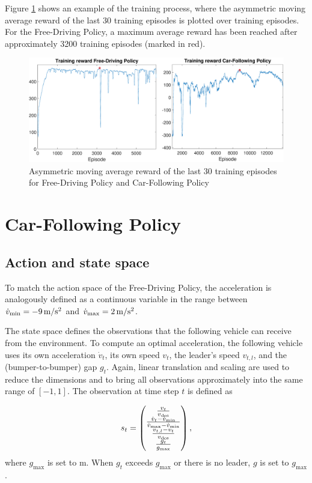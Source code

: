 \documentclass[review]{elsarticle}
\providecommand{\sub}[1]{_{\mathrm{#1}}}  %
\providecommand{\3}{{\ss}}
\begin{document}
	Figure \ref{fig:TrainingReward} shows an example of the training
	process, where the asymmetric moving average reward of the last 30 training episodes is plotted over training episodes. For the Free-Driving Policy, a maximum average reward has been reached after approximately 3200 training episodes (marked in red).
	\begin{figure}
		\centering
		\includegraphics[width=12cm]{images/TrainingReward}
		\caption{Asymmetric moving average reward of the last 30 training episodes for Free-Driving Policy and Car-Following Policy} 
		\label{fig:TrainingReward}
	\end{figure}
	
	\section{Car-Following Policy}
	\label{sec:CarFollowingPolicy}
	\subsection{Action and state space}
	\label{stateSpaceFollow}
	To match the action space of the Free-Driving Policy, the acceleration is analogously defined as a continuous variable in the range between $\dot{v}\sub{min} = \unit[-9]{m/s^2}$ and $\dot{v}\sub{max} =\unit[2]{m/s^2}$.	
	
	The state space defines the observations that the following
	vehicle can receive from the environment. To compute an optimal
	acceleration, the following vehicle uses its own acceleration $\dot{v}_t$,
	its own speed $v_t$, the leader's speed $v_{t,l}$,
	and the (bumper-to-bumper) gap $g_t$.
	Again, linear translation and scaling are used
	to reduce the dimensions and to bring all observations approximately
	into the same range of $[-1,1]$. The observation at time step $t$ is defined as
	
	\begin{equation}
		\label{eq:stateFollow}
		s_t = 
		\begin{pmatrix} 
			\frac{v_t}{v\sub{des}} \\ 
			\frac{\dot{v}_t-\dot{v}\sub{min}}{\dot{v}\sub{max} - \dot{v}\sub{min}}\\
			\frac{v_{t,l}-v_t}{v\sub{des}}\\
			\frac{g_t}{g\sub{\rm max}}
			
		\end{pmatrix},
	\end{equation}
	where $g\sub{max}$ is set to  \unit[200]{m}. When $g_t$ exceeds  $g\sub{max}$ or there is no leader, $g$ is set to  $g\sub{max}$.
	
\end{document}
